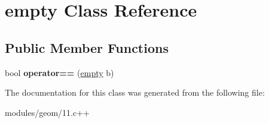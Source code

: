 \hypertarget{classempty}{\section{empty Class Reference}
\label{classempty}
}
\subsection*{Public Member Functions}
\begin{DoxyCompactItemize}
\item 
\hypertarget{classempty_a41c81d20468494906df5939df9479a7f}{bool {\bfseries operator==} (\hyperlink{classempty}{empty} b)}\label{classempty_a41c81d20468494906df5939df9479a7f}

\end{DoxyCompactItemize}


The documentation for this class was generated from the following file\-:\begin{DoxyCompactItemize}
\item 
modules/geom/11.\-c++\end{DoxyCompactItemize}
